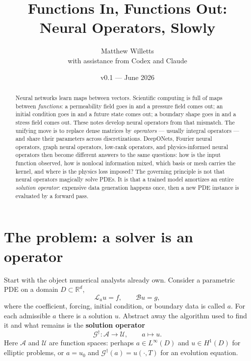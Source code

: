 \documentclass[10pt,a4paper]{article}
\title{Functions In, Functions Out:\\
\large Neural Operators, Slowly}
\author{Matthew Willetts\\{\small with assistance from Codex and Claude}}
\date{v0.1 --- June 2026}
\newcommand{\R}{\mathbb{R}}
\newcommand{\G}{\mathcal{G}}
\newcommand{\A}{\mathcal{A}}
\newcommand{\U}{\mathcal{U}}
\begin{document}
\maketitle

\begin{abstract}
\noindent Neural networks learn maps between vectors. Scientific computing is
full of maps between \emph{functions}: a permeability field goes in and a
pressure field comes out; an initial condition goes in and a future state
comes out; a boundary shape goes in and a stress field comes out. These notes
develop neural operators from that mismatch. The unifying move is to
replace dense matrices by \emph{operators} --- usually integral operators ---
and share their parameters across discretizations. DeepONets, Fourier neural
operators, graph neural operators, low-rank operators, and physics-informed
neural operators then become different answers to the same questions: how is
the input function observed, how is nonlocal information mixed, which basis or
mesh carries the kernel, and where is the physics loss imposed? The governing
principle is not that neural operators magically solve PDEs. It is that a
trained model amortizes an entire \emph{solution operator}: expensive data
generation happens once, then a new PDE instance is evaluated by a forward
pass.
\end{abstract}

\tableofcontents

\section{The problem: a solver is an operator}

Start with the object numerical analysts already own. Consider a parametric
PDE on a domain $D \subset \R^d$,
\begin{equation}
  \mathcal{L}_a u = f, \qquad \mathcal{B}u = g,
\label{eq:pde}
\end{equation}
where the coefficient, forcing, initial condition, or boundary data is called
$a$. For each admissible $a$ there is a solution $u$. Abstract away the
algorithm used to find it and what remains is the \textbf{solution operator}
\begin{equation}
  \G^\dagger : \A \to \U, \qquad a \mapsto u.
\label{eq:solution-operator}
\end{equation}
Here $\A$ and $\U$ are function spaces: perhaps
$a \in L^\infty(D)$ and $u \in H^1(D)$ for elliptic problems, or
$a = u_0$ and $\G^\dagger(a) = u(\cdot,T)$ for an evolution equation.
\end{document}
